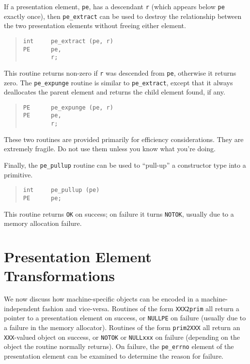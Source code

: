 If a presentation element, \verb"pe", has a descendant \verb"r"
(which appears below \verb"pe" exactly once),
then \verb"pe_extract" can be used to destroy the relationship between
the two presentation elements without freeing either element.
\begin{quote}\small\begin{verbatim}
int     pe_extract (pe, r)
PE      pe,
        r;
\end{verbatim}\end{quote}
This routine returns non-zero if \verb"r" was descended from \verb"pe",
otherwise it returns zero.
The \verb"pe_expunge" routine is similar to \verb"pe_extract",
except that it always deallocates the parent element and returns the child
element found, if any.
\begin{quote}\small\begin{verbatim}
PE      pe_expunge (pe, r)
PE      pe,
        r;
\end{verbatim}\end{quote}
These two routines are provided primarily for efficiency considerations.
They are extremely fragile.
Do not use them unless you know what you're doing.

Finally,
the \verb"pe_pullup" routine can be used to ``pull-up'' a constructor type
into a primitive.
\begin{quote}\small\begin{verbatim}
int     pe_pullup (pe)
PE      pe;
\end{verbatim}\end{quote}
This routine returns \verb"OK" on success;
on failure it turns \verb"NOTOK",
usually due to a memory allocation failure.

\section	{Presentation Element Transformations}
We now discuss how machine-specific objects can be encoded in a
machine-independent fashion and vice-versa.
Routines of the form \verb"XXX2prim" all return a pointer to a presentation
element on success,
or \verb"NULLPE" on failure
(usually due to a failure in the memory allocator).
Routines of the form \verb"prim2XXX" all return an \verb"XXX"-valued object
on success,
or \verb"NOTOK" or \verb"NULLxxx" on failure
(depending on the object the routine normally returns).
On failure,
the \verb"pe_errno" element of the presentation element can be examined to
determine the reason for failure.

